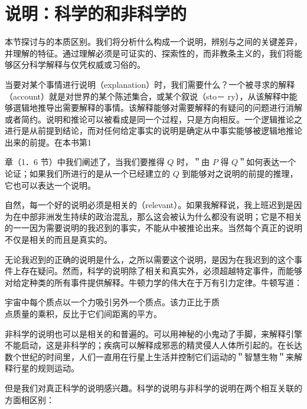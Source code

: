 \section{说明：科学的和非科学的}

\begin{logicbox}[title=引言]
本节探讨与的本质区别。我们将分析什么构成一个说明，辨别与之间的关键差异，并理解的特征。通过理解必须是可证实的、探索性的，而非教条主义的，我们将能够区分科学解释与仅凭权威或习俗的。
\end{logicbox}

当要对某个事情进行说明（explanation）时，我们需要什么？一个被寻求的解释（account）就是对世界的某个陈述集合，或某个叙说（sto－ ry），从该解释中能够選辑地推导出需要解释的事情。该解释能够对需要解释的有疑问的问题进行消解或者简约。说明和推论可以被看成是同一个过程，只是方向相反。一个逻辑推论之进行是从前提到结论，而对任何给定事实的说明是确定从中事实能够被逻辑地推论出来的前提。在本书第1

章（1．6 节）中我们阐述了，当我们要推得 $Q$ 时，＂由 $P$ 得 $Q$＂如何表达一个论证；如果我们所进行的是从一个已经建立的 $Q$ 到能够对之说明的前提的推理，它也可以表达一个说明。

自然，每一个好的说明必须是相关的（relevant）。如果我解释说，我上班迟到是因为在中部非洲发生持续的政治混乱，那么这会被认为什么都没有说明；它是不相关的一一因为需要说明的我迟到的事实，不能从中被推论出来。当然每个真正的说明不仅是相关的而且是真实的。

无论我迟到的正确的说明是什么，之所以需要这个说明，是因为在我迟到的这个事件上存在疑问。然而，科学的说明除了相关和真实外，必须超越特定事件，而能够对给定种类的所有事件提供解释。牛顿力学的伟大在于万有引力定律。牛顿写道：

\begin{displayquote}
宇宙中每个质点以一个力吸引另外一个质点。该力正比于质\\
点质量的乘积，反比于它们间距离的平方。
\end{displayquote}

非科学的说明也可以是相关的和普遍的。可以用神秘的小鬼动了手脚，来解释引擎不能启动，这是非科学的；疾病可以解释成邪恶的精灵侵人人体所引起的。在长达数个世纪的时间里，人们一直用在行星上生活并控制它们运动的＂智慧生物＂来解释行星的规则运动。

但是我们对真正科学的说明感兴趣。科学的说明与非科学的说明在两个相互关联的方面相区别：

